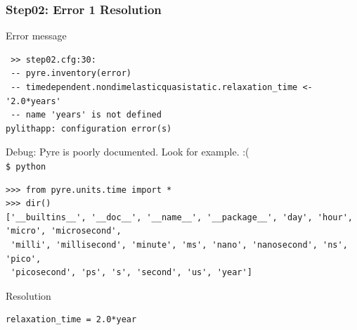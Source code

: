 \documentclass[aspectration=169]{beamer}
\newcommand{\cmd}[1]{{\footnotesize\tt \color{ltred}#1}}
\newcommand{\errlabel}[1]{{\small \color{blue}#1}}
\newcommand{\debuginfo}[1]{{\small \color{green}#1}}
\begin{document}
\begin{frame}[fragile]
  \frametitle{Step02: Error 1 Resolution}

\errlabel{Error message}
\begin{lstlisting}
 >> step02.cfg:30:
 -- pyre.inventory(error)
 -- timedependent.nondimelasticquasistatic.relaxation_time <- '2.0*years'
 -- name 'years' is not defined
pylithapp: configuration error(s)
\end{lstlisting}\pause
\errlabel{Debug:} \debuginfo{Pyre is poorly documented. Look for example. :(}\pause\\
\cmd{\$ python}
\begin{lstlisting}
>>> from pyre.units.time import *
>>> dir()
['__builtins__', '__doc__', '__name__', '__package__', 'day', 'hour', 'micro', 'microsecond',
 'milli', 'millisecond', 'minute', 'ms', 'nano', 'nanosecond', 'ns', 'pico',
 'picosecond', 'ps', 's', 'second', 'us', 'year']
\end{lstlisting}
\errlabel{Resolution}
\begin{lstlisting}
relaxation_time = 2.0*year
\end{lstlisting}

\end{frame}
\end{document}
